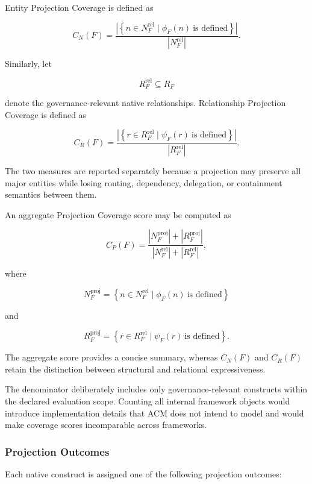\documentclass[10pt]{article}
\begin{document}
Entity Projection Coverage is defined as

\[
C_N(F)
=
\frac{
\left|
\left\{
n\in N_F^{\mathrm{rel}}
\mid
\phi_F(n)\ \text{is defined}
\right\}
\right|
}{
|N_F^{\mathrm{rel}}|
}.
\tag{46}
\]

Similarly, let

\[
R_F^{\mathrm{rel}}
\subseteq
R_F
\]

denote the governance-relevant native relationships. Relationship Projection
Coverage is defined as

\[
C_R(F)
=
\frac{
\left|
\left\{
r\in R_F^{\mathrm{rel}}
\mid
\psi_F(r)\ \text{is defined}
\right\}
\right|
}{
|R_F^{\mathrm{rel}}|
}.
\tag{47}
\]

The two measures are reported separately because a projection may preserve all
major entities while losing routing, dependency, delegation, or containment
semantics between them.

An aggregate Projection Coverage score may be computed as

\[
C_P(F)
=
\frac{
|N_F^{\mathrm{proj}}|
+
|R_F^{\mathrm{proj}}|
}{
|N_F^{\mathrm{rel}}|
+
|R_F^{\mathrm{rel}}|
},
\tag{48}
\]

where

\[
N_F^{\mathrm{proj}}
=
\left\{
n\in N_F^{\mathrm{rel}}
\mid
\phi_F(n)\ \text{is defined}
\right\}
\]

and

\[
R_F^{\mathrm{proj}}
=
\left\{
r\in R_F^{\mathrm{rel}}
\mid
\psi_F(r)\ \text{is defined}
\right\}.
\]

The aggregate score provides a concise summary, whereas $C_N(F)$ and $C_R(F)$
retain the distinction between structural and relational expressiveness.

The denominator deliberately includes only governance-relevant constructs
within the declared evaluation scope. Counting all internal framework objects
would introduce implementation details that ACM does not intend to model and
would make coverage scores incomparable across frameworks.

\subsubsection{Projection Outcomes}

Each native construct is assigned one of the following projection outcomes:
\end{document}
